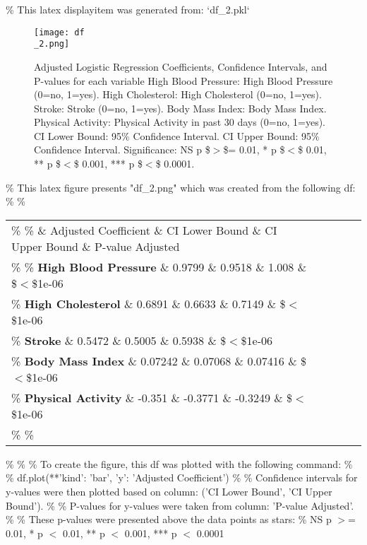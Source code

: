 \documentclass[11pt]{article}
\begin{document}
\begin{codeoutput}
\% This latex displayitem was generated from: `df\_2.pkl`

\begin{figure}[htbp]
\centering
\texttt{[image: df\\\_2.png]}
\caption{Adjusted Logistic Regression Coefficients, Confidence Intervals, and P-values for each variable
High Blood Pressure: High Blood Pressure (0=no, 1=yes). 
High Cholesterol: High Cholesterol (0=no, 1=yes). 
Stroke: Stroke (0=no, 1=yes). 
Body Mass Index: Body Mass Index. 
Physical Activity: Physical Activity in past 30 days (0=no, 1=yes). 
CI Lower Bound: 95\% Confidence Interval. 
CI Upper Bound: 95\% Confidence Interval. 
Significance: NS p \$$>$\$= 0.01, * p \$$<$\$ 0.01, ** p \$$<$\$ 0.001, *** p \$$<$\$ 0.0001. }
\label{figure:Adjusted\_Coefficients}
\end{figure}
\% This latex figure presents "df\_2.png" which was created from the following df:
\% 
\% \begin{tabular}{lrrrl}
\% \toprule
\%  \& Adjusted Coefficient \& CI Lower Bound \& CI Upper Bound \& P-value Adjusted \\
\% \midrule
\% \textbf{High Blood Pressure} \& 0.9799 \& 0.9518 \& 1.008 \& \$$<$\$1e-06 \\
\% \textbf{High Cholesterol} \& 0.6891 \& 0.6633 \& 0.7149 \& \$$<$\$1e-06 \\
\% \textbf{Stroke} \& 0.5472 \& 0.5005 \& 0.5938 \& \$$<$\$1e-06 \\
\% \textbf{Body Mass Index} \& 0.07242 \& 0.07068 \& 0.07416 \& \$$<$\$1e-06 \\
\% \textbf{Physical Activity} \& -0.351 \& -0.3771 \& -0.3249 \& \$$<$\$1e-06 \\
\% \bottomrule
\% \end{tabular}
\% 
\% 
\% To create the figure, this df was plotted with the following command:
\% 
\% df.plot(**{'kind': 'bar', 'y': 'Adjusted Coefficient'})
\% 
\% Confidence intervals for y-values were then plotted based on column: ('CI Lower Bound', 'CI Upper Bound').
\% 
\% P-values for y-values were taken from column: 'P-value Adjusted'.
\% 
\% These p-values were presented above the data points as stars:
\% NS p $>$= 0.01, * p $<$ 0.01, ** p $<$ 0.001, *** p $<$ 0.0001
\end{codeoutput}
\end{document}
